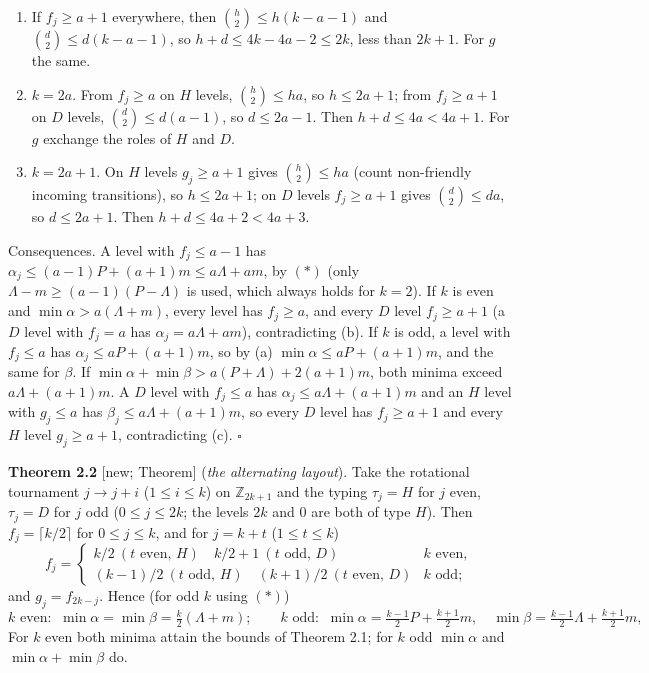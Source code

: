 \documentclass[
  10pt,
]{article}
\begin{document}
\begin{enumerate}
\def\labelenumi{(\alph{enumi})}
\item
  If \(f_j\ge a+1\) everywhere, then \(\binom h2\le h(k-a-1)\) and
  \(\binom d2\le d(k-a-1)\), so \(h+d\le 4k-4a-2\le 2k\), less than
  \(2k+1\). For \(g\) the same.
\item
  \(k=2a\). From \(f_j\ge a\) on \(H\) levels, \(\binom h2\le ha\), so
  \(h\le 2a+1\); from \(f_j\ge a+1\) on \(D\) levels,
  \(\binom d2\le d(a-1)\), so \(d\le 2a-1\). Then \(h+d\le4a<4a+1\). For
  \(g\) exchange the roles of \(H\) and \(D\).
\item
  \(k=2a+1\). On \(H\) levels \(g_j\ge a+1\) gives \(\binom h2\le ha\)
  (count non-friendly incoming transitions), so \(h\le2a+1\); on \(D\)
  levels \(f_j\ge a+1\) gives \(\binom d2\le da\), so \(d\le 2a+1\).
  Then \(h+d\le4a+2<4a+3\).
\end{enumerate}

Consequences. A level with \(f_j\le a-1\) has
\(\alpha_j\le(a-1)P+(a+1)m\le a\Lambda+am\), by \((\ast)\) (only
\(\Lambda-m\ge(a-1)(P-\Lambda)\) is used, which always holds for
\(k=2\)). If \(k\) is even and \(\min\alpha>a(\Lambda+m)\), every level
has \(f_j\ge a\), and every \(D\) level \(f_j\ge a+1\) (a \(D\) level
with \(f_j=a\) has \(\alpha_j=a\Lambda+am\)), contradicting (b). If
\(k\) is odd, a level with \(f_j\le a\) has \(\alpha_j\le aP+(a+1)m\),
so by (a) \(\min\alpha\le aP+(a+1)m\), and the same for \(\beta\). If
\(\min\alpha+\min\beta>a(P+\Lambda)+2(a+1)m\), both minima exceed
\(a\Lambda+(a+1)m\). A \(D\) level with \(f_j\le a\) has
\(\alpha_j\le a\Lambda+(a+1)m\) and an \(H\) level with \(g_j\le a\) has
\(\beta_j\le a\Lambda+(a+1)m\), so every \(D\) level has \(f_j\ge a+1\)
and every \(H\) level \(g_j\ge a+1\), contradicting (c). \(\square\)

\textbf{Theorem 2.2} {[}new; Theorem{]} (\emph{the alternating layout}).
Take the rotational tournament \(j\to j+i\) (\(1\le i\le k\)) on
\(\mathbb Z_{2k+1}\) and the typing \(\tau_j=H\) for \(j\) even,
\(\tau_j=D\) for \(j\) odd (\(0\le j\le 2k\); the levels \(2k\) and
\(0\) are both of type \(H\)). Then \(f_j=\lceil k/2\rceil\) for
\(0\le j\le k\), and for \(j=k+t\) (\(1\le t\le k\))
\[f_j=\begin{cases}k/2\ (t\text{ even, }H)\quad k/2+1\ (t\text{ odd, }D)&k\text{ even},\\
(k-1)/2\ (t\text{ odd, }H)\quad (k+1)/2\ (t\text{ even, }D)&k\text{ odd};\end{cases}\]
and \(g_j=f_{2k-j}\). Hence (for odd \(k\) using \((\ast)\))
\[k\text{ even: }\ \min\alpha=\min\beta=\tfrac k2(\Lambda+m);\qquad k\text{ odd: }\ \min\alpha=\tfrac{k-1}2P+\tfrac{k+1}2m,
\quad\min\beta=\tfrac{k-1}2\Lambda+\tfrac{k+1}2m,\] For \(k\) even both
minima attain the bounds of Theorem 2.1; for \(k\) odd \(\min\alpha\)
and \(\min\alpha+\min\beta\) do.
\end{document}
